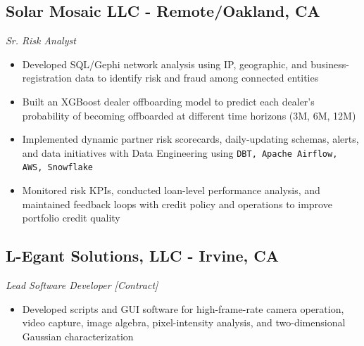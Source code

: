 \documentclass[11pt,a4paper]{article}
\newenvironment{myitemize}
{ \begin{itemize}[label={--}, leftmargin=*]
		\setlength{\itemsep}{0pt}
		\setlength{\parskip}{0pt}
		\setlength{\parsep}{0pt}     }
	{ \end{itemize}                  }
\begin{document}
		\vspace{-8mm} %
	\subsection*{Solar Mosaic LLC - Remote/Oakland, CA \hfill
	\vspace{-1mm}
	 }
\vspace{-1.5mm}
\textit{Sr. Risk Analyst}
\vspace{-2.5mm}
\begin{myitemize}
	\item Developed SQL/Gephi network analysis using IP, geographic, and business-registration data to identify risk and fraud among connected entities
\item Built an XGBoost dealer offboarding model to predict each dealer's probability of becoming offboarded at different time horizons (3M, 6M, 12M)
	\item Implemented dynamic partner risk scorecards, daily-updating schemas, alerts, and data initiatives with Data Engineering using \texttt{DBT, Apache Airflow, AWS, Snowflake}
	\item Monitored risk KPIs, conducted loan-level performance analysis, and maintained feedback loops with credit policy and operations to improve portfolio credit quality
\end{myitemize}
		\vspace{-8mm} %
	\subsection*{L-Egant Solutions, LLC - Irvine, CA \hfill
					\vspace{-1mm} %
		  }
	\vspace{-1.5mm} %
	\textit{Lead Software Developer [Contract]}
	\vspace{-2.5mm} %
\begin{myitemize}
	\item Developed scripts and GUI software for high-frame-rate camera operation, video capture, image algebra, pixel-intensity analysis, and two-dimensional Gaussian characterization
\end{myitemize}
		\vspace{-8mm} %
\end{document}
